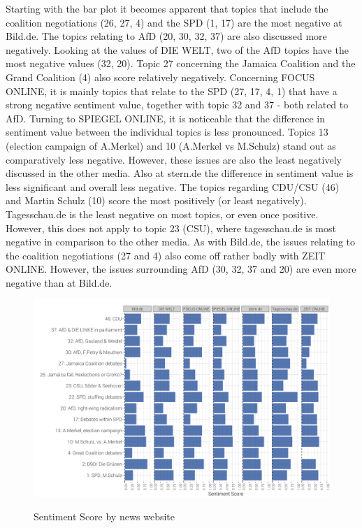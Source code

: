 \documentclass[12pt,a4paper,notitlepage]{article}
\begin{document}
Starting with the bar plot it becomes apparent that  topics that include the coalition negotiations (26, 27, 4) and the SPD (1, 17) are the most negative at Bild.de. The topics relating to AfD (20, 30, 32, 37) are also discussed more negatively. Looking at the values of DIE WELT, two of the AfD topics have the most negative values (32, 20). Topic 27 concerning the Jamaica Coalition and the Grand Coalition (4) also score relatively negatively. Concerning FOCUS ONLINE, it is mainly topics that relate to the SPD (27, 17, 4, 1) that have a strong negative sentiment value, together with topic 32 and 37 - both related to AfD. Turning to SPIEGEL ONLINE, it is noticeable that the difference in sentiment value between the individual topics is less pronounced. Topics 13 (election campaign of A.Merkel) and 10 (A.Merkel vs M.Schulz) stand out as comparatively less negative. However, these issues are also the least negatively discussed in the other media. Also at stern.de the difference in sentiment value is less significant and overall less negative. The topics regarding CDU/CSU (46) and Martin Schulz (10) score the most positively (or least negatively). Tagesschau.de is the least negative on most topics, or even once positive. However, this does not apply to topic 23 (CSU), where tagesschau.de is most negative in comparison to the other media. As with Bild.de, the issues relating to the coalition negotiations (27 and 4) also come off rather badly with ZEIT ONLINE. However, the issues surrounding AfD (30, 32, 37 and 20) are even more negative than at Bild.de. 

\begin{figure}[H]
	\caption{Sentiment Score by news website}
	\begin{center}
			\includegraphics[width=\textwidth,keepaspectratio]{figs/sentscore_site.png}
			\label{fig_sentscore_site}
	\end{center}
\end{figure}
\end{document}
